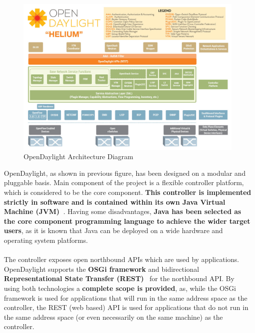 \documentclass[a4paper, 12pt]{book}
\begin{document}
\begin{center}
 \begin{figure}[H]
 \begin{center}
   \includegraphics[width=15cm]{img/odl-technologies-01.png}
   \caption{OpenDaylight Architecture Diagram}
   \label{fig:odl_tech_diagram}
 \end{center}
 \end{figure}
\end{center}
OpenDaylight, as shown in previous figure, has been designed on a modular and pluggable basis. Main component of the project is a flexible controller platform, which is considered to be the core component. \textbf{This controller is implemented strictly in software and is contained within its own Java Virtual Machine (JVM)~\cite{Java}}. Having some disadvantages, \textbf{Java has been selected as the core component programming language to achieve the wider target users}, as it is known that Java can be deployed on a wide hardware and operating system platforms.\\
\\
The controller exposes open northbound APIs which are used by applications. OpenDaylight supports the \textbf{OSGi framework} and bidirectional \textbf{Representational State Transfer (REST)}~\cite{REST} for the northbound API. By using both technologies a \textbf{complete scope is provided}, as, while the OSGi framework is used for applications that will run in the same address space as the controller, the REST (web based) API is used for applications that do not run in the same address space (or even necessarily on the same machine) as the controller.\\
\end{document}
